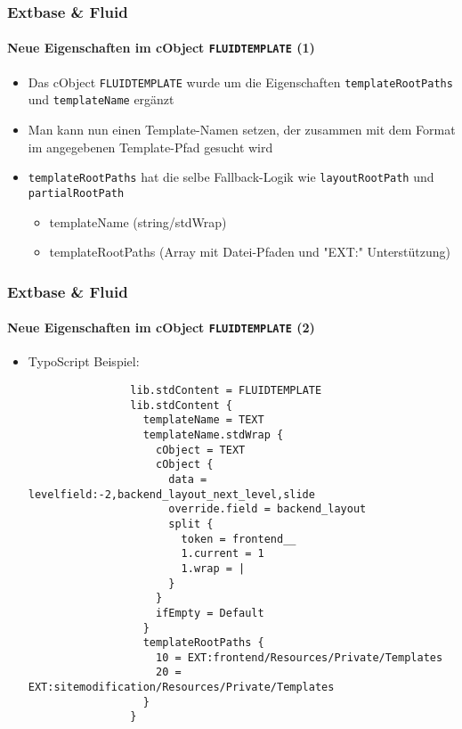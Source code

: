 \begin{frame}[fragile]
	\frametitle{Extbase \& Fluid}
	\framesubtitle{Neue Eigenschaften im cObject \texttt{FLUIDTEMPLATE} (1)}

	\begin{itemize}

		\item Das cObject \texttt{FLUIDTEMPLATE} wurde um die Eigenschaften
			\texttt{templateRootPaths} und \texttt{templateName} ergänzt

		\item Man kann nun einen Template-Namen setzen, der zusammen mit dem
			Format im angegebenen Template-Pfad gesucht wird

		\item \texttt{templateRootPaths} hat die selbe Fallback-Logik wie
			\texttt{layoutRootPath} und \texttt{partialRootPath}

			\begin{itemize}
				\item templateName (string/stdWrap)
				\item templateRootPaths (Array mit Datei-Pfaden und "EXT:" Unterstützung)
			\end{itemize}

	\end{itemize}

\end{frame}


\begin{frame}[fragile]
	\frametitle{Extbase \& Fluid}
	\framesubtitle{Neue Eigenschaften im cObject \texttt{FLUIDTEMPLATE} (2)}

	\lstset{basicstyle=\tiny\ttfamily}

	\begin{itemize}

		\item TypoScript Beispiel:

			\begin{lstlisting}
				lib.stdContent = FLUIDTEMPLATE
				lib.stdContent {
				  templateName = TEXT
				  templateName.stdWrap {
				    cObject = TEXT
				    cObject {
				      data = levelfield:-2,backend_layout_next_level,slide
				      override.field = backend_layout
				      split {
				        token = frontend__
				        1.current = 1
				        1.wrap = |
				      }
				    }
				    ifEmpty = Default
				  }
				  templateRootPaths {
				    10 = EXT:frontend/Resources/Private/Templates
				    20 = EXT:sitemodification/Resources/Private/Templates
				  }
				}
			\end{lstlisting}

	\end{itemize}

\end{frame}


